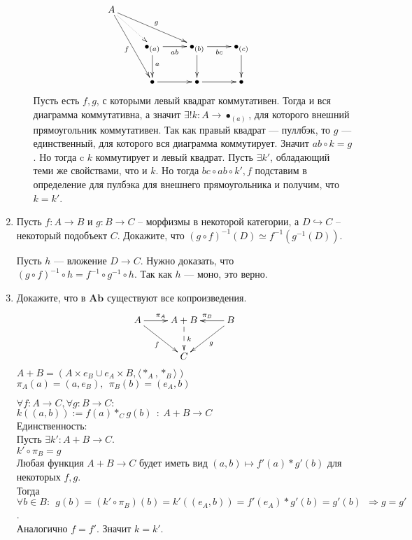 \documentclass[draft]{article}
\newcommand{\cat}[1]{\mathbf{#1}}
\newcommand{\Ab}{\cat{Ab}}
\begin{document}
\begin{enumerate}
\begin{itemize}
\[ \xymatrix{ 
A \ar@{..>}[dr] \ar[ddr]_f \ar[rrd]^g & & & &\\
& \bullet_{(a)} \ar[r]_{ab} \ar[d]^a & \bullet_{(b)} \ar[r]_{bc} \ar[d] & \bullet_{(c)} \ar[d]\\
& \bullet \ar[r]      & \bullet \ar[r]        & \bullet
} \]
Пусть есть $f, g$, с которыми левый квадрат коммутативен. Тогда и вся диаграмма коммутативна, а значит $\exists!k : A \to \bullet_{(a)}$, для которого внешний прямоугольник коммутативен. Так как правый квадрат --- пуллбэк, то $g$ --- единственный, для которого вся диаграмма коммутирует. Значит $ab \circ k = g$. Но тогда c $k$ коммутирует и левый квадрат. Пусть  $\exists k'$, обладающий теми же свойствами, что и $k$. Но тогда $bc\circ ab \circ k', f$ подставим в определение для пулбэка для внешнего прямоугольника и получим, что $k = k'$.


\end{itemize}

\item Пусть $f : A \to B$ и $g : B \to C$ -- морфизмы в некоторой категории, а $D \hookrightarrow C$ -- некоторый подобъект $C$.
Докажите, что $(g \circ f)^{-1}(D) \simeq f^{-1}(g^{-1}(D))$.

Пусть $h$ --- вложение $D\to C$. Нужно доказать, что $(g \circ f)^{-1} \circ h = f^{-1} \circ g^{-1} \circ h$. Так как $h$ --- моно, это верно.

\item Докажите, что в $\Ab$ существуют все копроизведения.\\

\[ \xymatrix{ 
A\ar[r]^{\pi_A} \ar[dr]_{f} & A+B \ar@{-->}[d]^k & B \ar[l]_{\pi_B} \ar[ld]^{g}\\
 & C&
} \]
$A+B = (A\times e_B \cup e_A\times B, \langle \ast_A, \ast_B\rangle)$\\
$\pi_A(a) = (a, e_B),~~\pi_B(b) = (e_A, b)$

$\forall f : A \to C, \forall g : B \to C:$\\
$k((a, b)) := f(a)\ast_C g(b) ~~:~A+B \to C$\\

Единственность:\\
Пусть $\exists k': A+B\to C$.\\
$k' \circ \pi_B = g$\\
Любая функция $A+B\to C$ будет иметь вид $(a, b)\mapsto f'(a)\ast g'(b)$ для некоторых $f, g$. \\
Тогда $\forall b \in B:~~ g(b) = (k' \circ \pi_B)(b) = k'((e_A, b)) = f'(e_A)\ast g'(b) = g'(b)~~\Rightarrow g = g'$.\\
Аналогично $f = f'$. Значит $k=k'$.


\end{enumerate}
\end{document}
